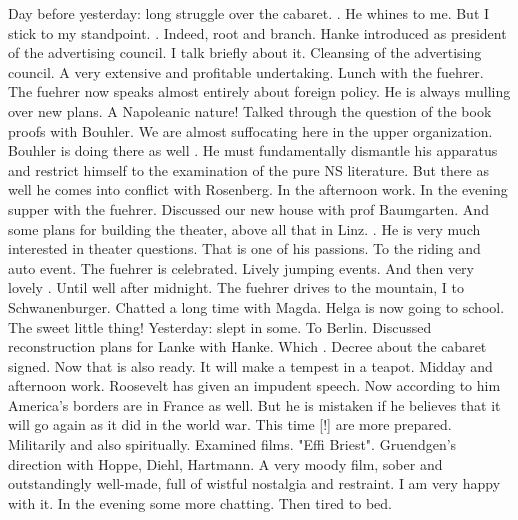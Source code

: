 Day before yesterday: long struggle over the cabaret. . He whines to me. But I stick to my standpoint. . Indeed, root and branch. Hanke introduced as president of the advertising council. I talk briefly about it. Cleansing of the advertising council. A very extensive and profitable undertaking. Lunch with the fuehrer. The fuehrer now speaks almost entirely about foreign policy. He is always mulling over new plans. A Napoleanic nature! Talked through the question of the book proofs with Bouhler. We are almost suffocating here in the upper organization. Bouhler is doing there as well .  He must fundamentally dismantle his apparatus and restrict himself to the examination of the pure NS literature. But there as well he comes into conflict with Rosenberg. In the afternoon work. In the evening supper with the fuehrer. Discussed our new house with prof Baumgarten. And some plans for building the theater, above all that in Linz. . He is very much interested in theater questions. That is one of his passions. To the riding and auto event. The fuehrer is celebrated. Lively jumping events. And then very lovely . Until well after midnight. The fuehrer drives to the mountain, I to Schwanenburger. Chatted a long time with Magda. Helga is now going to school. The sweet little thing!
Yesterday: slept in some. To Berlin. Discussed reconstruction plans for Lanke with Hanke. Which .  Decree about the cabaret signed. Now that is also ready. It will make a tempest in a teapot. Midday and afternoon work. Roosevelt has given an impudent speech. Now according to him America's borders are in France as well. But he is mistaken if he believes that it will go again as it did in the world war. This time [!] are more prepared. Militarily and also spiritually. Examined films. "Effi Briest". Gruendgen's direction with Hoppe, Diehl, Hartmann. A very moody film, sober and outstandingly well-made, full of wistful nostalgia and restraint. I am very happy with it. In the evening some more chatting. Then tired to bed.
